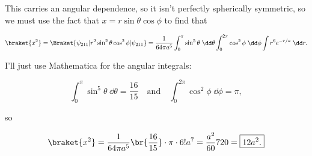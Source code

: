 \begin{parts}
This carries an angular dependence, so it isn't perfectly spherically symmetric, so we must use the fact that $x = r\sin\theta\cos\phi$ to find that

\begin{equation}
    \braket{x^2} = \Braket{\psi_{211} | r^2\sin^2\theta\cos^2\phi | \psi_{211}} = \frac{1}{64\pi a^5} \int_0^{\pi}\sin^5\theta \;\dd\theta \int_0^{2\pi}\cos^2\phi \;\dd\phi \int r^6 e^{-r/a} \;\dd r.
\end{equation} 

I'll just use Mathematica for the angular integrals:

\begin{equation}
    \int_0^{\pi} \sin^5\theta\;\dd\theta = \frac{16}{15} \quad\mathrm{and}\quad \int_0^{2\pi}\cos^2\phi\;\dd\phi = \pi,
\end{equation}

so

\begin{equation}
    \braket{x^2} = \frac{1}{64\pi a^5} \br{\frac{16}{15}}\cdot \pi \cdot 6! a^7 = \frac{a^2}{60}720 = \boxed{12a^2.}
\end{equation}








\end{parts}